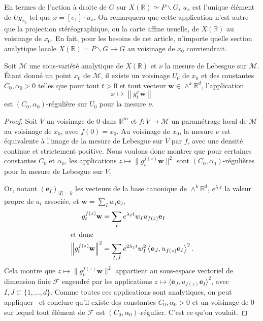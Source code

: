 \documentclass[AHL,Unicode,longabstracts,francais,published]{cedram}
\newcommand{\bracket}[1]{\langle#1\rangle}
\newcommand{\bcs}{\backslash}
\newcommand{\se}[2]{\{#1,\dots,#2\}}
\newcommand{\R}{\mathbb{R}}
\newcommand{\bw}{\mathbf{w}}
\newcommand{\be}{\mathbf{e}}
\newcommand{\cM}{\mathcal{M}}
\newcommand{\cF}{\mathcal{F}}
\begin{document}
\begin{rema}
En termes de l'action à droite de $G$ sur $X(\R)\simeq P\bcs G$, $u_x$ est l'unique élément de $Ug_{x_0}$ tel que $x=[e_1]\cdot u_x$. On remarquera que cette application n'est autre que la projection stéréographique, ou la carte affine usuelle, de $X(\R)$ au voisinage de $x_0$. En fait, pour les besoins de cet article, n'importe quelle section analytique locale $X(\R)=P\bcs G\to G$ au voisinage de $x_0$ conviendrait.
\end{rema}


\begin{prop}\label{regreg}
Soit $\cM$ une sous-variété analytique de $X(\R)$ et $\nu$ la mesure de Lebesgue sur $\cM$. Étant donné un point $x_0$ de $\cM$, il existe un voisinage $U_0$ de $x_0$ et des constantes $C_0,\alpha_0>0$ telles que pour tout $t>0$ et tout vecteur $\bw\in\wedge^k\R^d$, l'application
\[
x \mapsto \left\|g_t^x \bw\right\|
\]
est $(C_0,\alpha_0)$-régulière sur $U_0$ pour la mesure $\nu$.
\end{prop}

\begin{proof}
Soit $V$ un voisinage de $0$ dans $\R^m$ et $f:V\to\cM$ un paramétrage local de $\cM$ au voisinage de $x_0$, avec $f(0)=x_0$. Au voisinage de $x_0$, la mesure $\nu$ est équivalente à l'image de la mesure de Lebesgue sur $V$ par $f$, avec une densité continue et strictement positive. Nous voulons donc montrer que pour certaines constantes $C_0$ et $\alpha_0$, les applications $z\mapsto \|g_t^{f(z)}\bw\|^2$ sont $(C_0,\alpha_0)$-régulières pour la mesure de Lebesgue sur $V$.

Or, notant $(\be_I)_{|I|=k}$ les vecteurs de la base canonique de $\wedge^k\R^d$, $e^{\lambda_I t}$ la valeur propre de $a_t$ associée, et $\bw=\sum_I w_I\be_I$,
\begin{align*}
g_t^{f(z)}\bw &= \sum_I e^{\lambda_I t} w_I u_{f(z)}\be_I
\\
\intertext{et donc}
\left\|g_t^{f(z)}\bw\right\|^2 &= \sum_{I,J} e^{2\lambda_I t}w_I^2 \left\langle\be_J,u_{f(z)}\be_I\right\rangle^2.
\end{align*}
Cela montre que $z\mapsto\|g_t^{f(z)}\bw\|^2$ appartient au sous-espace vectoriel de dimension finie $\cF$ engendré par les applications $z\mapsto\bracket{\be_J,u_{f(z)}\be_I}^2$, avec $I,J\subset\se{1}{d}$. Comme toutes ces applications sont analytiques, on peut appliquer~\cite[Proposition~2.1]{kleinbock_dichotomy} et conclure qu'il existe des constantes $C_0,\alpha_0>0$ et un voisinage de $0$ sur lequel tout élément de $\cF$ est $(C_0,\alpha_0)$-régulier. C'est ce qu'on voulait.
\end{proof}
\end{document}
